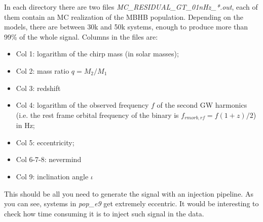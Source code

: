 \documentclass[prd,aps,eqsecnum]{revtex4}
\begin{document}
In each directory there are two files {\it MC\_RESIDUAL\_GT\_01nHz\_*.out}, each of them contain an MC realization of the MBHB population. Depending on the models, there are between 30k and 50k systems, enough to produce more than 99\% of the whole signal. Columns in the files are:
\begin{itemize}
\item Col 1: logarithm of the chirp mass (in solar masses);
\item Col 2: mass ratio $q=M_2/M_1$
\item Col 3: redshift
\item Col 4: logarithm of the observed frequency $f$ of the second GW harmonics (i.e. the rest frame orbital frequency of the binary is $f_{rm orb,rf}=f(1+z)/2$) in Hz;
\item Col 5: eccentricity;
\item Col 6-7-8: nevermind
\item Col 9: inclination angle $\iota$
\end{itemize}

This should be all you need to generate the signal with an injection pipeline. As you can see, systems in {\it pop\_e9} get extremely eccentric. It would be interesting to check how time consuming it is to inject such signal in the data.
\end{document}
